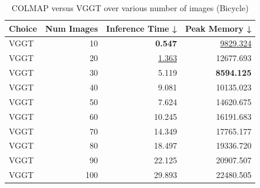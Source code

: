 \begin{table}[H]
\caption{\ifdefined\customcaption \customcaption \else COLMAP versus VGGT over various number of images (Bicycle) \fi}
\label{tab:01_num_images_timing_bicycle}
\centering
\scriptsize
\begin{tabular}{lrrr}
\toprule
Choice & Num Images & Inference Time ↓ & Peak Memory ↓ \\
\midrule
VGGT & 10 & \textbf{0.547} & \underline{9829.324} \\
VGGT & 20 & \underline{1.363} & 12677.693 \\
VGGT & 30 & 5.119 & \textbf{8594.125} \\
VGGT & 40 & 9.081 & 10135.023 \\
VGGT & 50 & 7.624 & 14620.675 \\
VGGT & 60 & 10.245 & 16191.683 \\
VGGT & 70 & 14.349 & 17765.177 \\
VGGT & 80 & 18.497 & 19336.720 \\
VGGT & 90 & 22.125 & 20907.507 \\
VGGT & 100 & 29.893 & 22480.505 \\
\bottomrule
\end{tabular}
\end{table}